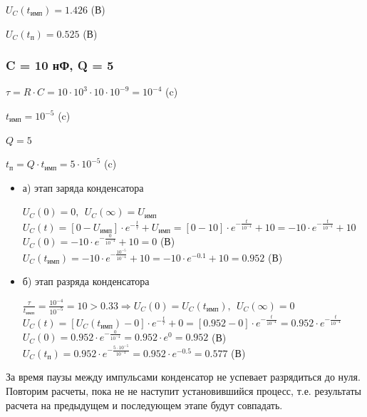	$U_C(t_\text{имп}) = 1.426$ (В)
	
	$U_C(t_\text{п}) = 0.525$ (В)
	
\subsubsection{C = 10 нФ, Q = 5}

		$\tau = R \cdot C = 10 \cdot 10^3 \cdot 10 \cdot 10^{-9} = 10^{-4}$ (c)
		
		$t_\text{имп} = 10^{-5}$ (c)
		
		$Q = 5$		
		
		$t_\text{п} = Q \cdot t_\text{имп} = 5 \cdot 10^{-5}$ (c)
		
		
\begin{itemize}
\item[] а) этап заряда конденсатора

		$U_C(0) = 0,\ \ U_C(\infty) = U_\text{имп}$\\	
		$U_C(t) = [0 - U_\text{имп}] \cdot e^{-\frac{t}{\tau}} + U_\text{имп} = [0 - 10] \cdot e^{-\frac{t}{10^{-4}}} + 10 = -10 \cdot e^{-\frac{t}{10^{-4}}} + 10$\\
		$U_C(0) = -10 \cdot e^{-\frac{0}{10^{-4}}} + 10 = 0$ (В)\\
		$U_C(t_\text{имп}) = -10 \cdot e^{-\frac{10^{-5}}{10^{-4}}} + 10 = -10 \cdot e^{-0.1} + 10 = 0.952$ (В)\\
		
\item[] б) этап разряда конденсатора
	
		$\frac{\tau}{t_\text{имп}} = \frac{10^{-4}}{10^{-5}} = 10 > 0.33 \Rightarrow U_C(0) = U_C(t_\text{имп}),\ \ U_C(\infty) = 0$\\
		$U_C(t) = [U_C(t_\text{имп}) - 0] \cdot e^{-\frac{t}{\tau}} + 0 =  [0.952 - 0] \cdot e^{-\frac{t}{10^{-4}}} = 0.952 \cdot e^{-\frac{t}{10^{-4}}}$\\
		$U_C(0) = 0.952 \cdot e^{-\frac{0}{10^{-4}}} = 0.952 \cdot e^0 = 0.952$ (В)\\
		$U_C(t_\text{п}) = 0.952 \cdot e^{-\frac{5 \cdot 10^{-5}}{10^{-4}}} = 0.952 \cdot e^{-0.5} = 0.577$ (В)\\
		
\end{itemize}				
		
За время паузы между импульсами конденсатор не успевает разрядиться до нуля. Повторим расчеты, пока не не наступит установившийся процесс, т.е. результаты расчета на предыдущем и последующем этапе будут совпадать.	
	
